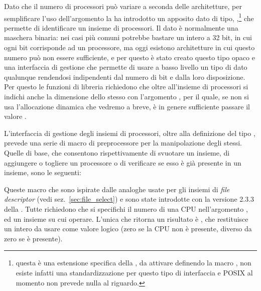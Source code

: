 Dato che il numero di processori può variare a seconda delle architetture, per
semplificare l'uso dell'argomento  la  ha introdotto un
apposito dato di tipo, ,\footnote{questa è una estensione
  specifica della , da attivare definendo la macro
  , non esiste infatti una standardizzazione per questo
  tipo di interfaccia e POSIX al momento non prevede nulla al riguardo.} che
permette di identificare un insieme di processori. Il dato è normalmente una
maschera binaria: nei casi più comuni potrebbe bastare un intero a 32 bit, in
cui ogni bit corrisponde ad un processore, ma oggi esistono architetture in
cui questo numero può non essere sufficiente, e per questo è stato creato
questo tipo opaco e una interfaccia di gestione che permette di usare a basso
livello un tipo di dato qualunque rendendosi indipendenti dal numero di bit e
dalla loro disposizione.  Per questo le funzioni di libreria richiedono che
oltre all'insieme di processori si indichi anche la dimensione dello stesso
con l'argomento , per il quale, se non si usa l'allocazione
dinamica che vedremo a breve, è in genere sufficiente passare il valore
.

L'interfaccia di gestione degli insiemi di processori, oltre alla definizione
del tipo , prevede una serie di macro di preprocessore per
la manipolazione degli stessi. Quelle di base, che consentono rispettivamente
di svuotare un insieme, di aggiungere o togliere un processore o di verificare
se esso è già presente in un insieme, sono le seguenti:

{\centering
\vspace{3pt}
\begin{funcbox}{ 
}
\end{funcbox}}

Queste macro che sono ispirate dalle analoghe usate per gli insiemi di
\textit{file descriptor} (vedi sez.~\ref{sec:file_select}) e sono state
introdotte con la versione 2.3.3 della . Tutte richiedono che si
specifichi il numero di una CPU nell'argomento , ed un insieme su
cui operare. L'unica che ritorna un risultato è , che
restituisce un intero da usare come valore logico (zero se la CPU non è
presente, diverso da zero se è presente).

